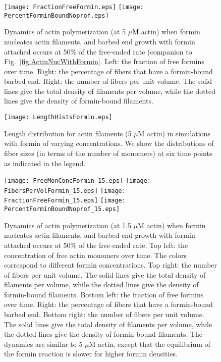 \documentclass[11pt]{article}
\begin{document}
\begin{appendices}
\begin{figure}
\centering
\texttt{[image: FractionFreeFormin.eps]}
\texttt{[image: PercentForminBoundNoprof.eps]}
\caption{Dynamics of actin polymerization (at 5 $\mu$M actin) when formin nucleates actin filaments, and barbed end growth with formin attached occurs at 50\% of the free-ended rate (companion to Fig.\ \ref{fig:ActinNucWithFormin}. Left: the fraction of free formins over time. Right: the percentage of fibers that have a formin-bound barbed end. Right: the number of fibers per unit volume. The solid lines give the total density of filaments per volume, while the dotted lines give the density of formin-bound filaments.}
\end{figure}


\begin{figure}
\centering
\texttt{[image: LengthHistsFormin.eps]}
\caption{\label{fig:HistsWithFormin}Length distribution for actin filaments (5 $\mu$M actin) in simulations with formin of varying concentrations. We show the distributions of fiber sizes (in terms of the number of monomers) at six time points as indicated in the legend.}
\end{figure}

\begin{figure}
\centering
\texttt{[image: FreeMonConcFormin\_15.eps]}
\texttt{[image: FibersPerVolFormin\_15.eps]}
\texttt{[image: FractionFreeFormin\_15.eps]}
\texttt{[image: PercentForminBoundNoprof\_15.eps]}
\caption{\label{fig:ActinLowNucWithFormin}Dynamics of actin polymerization (at 1.5 $\mu$M actin) when formin nucleates actin filaments, and barbed end growth with formin attached occurs at 50\% of the free-ended rate. Top left: the concentration of free actin monomers over time. The colors correspond to different formin concentrations. Top right: the number of fibers per unit volume. The solid lines give the total density of filaments per volume, while the dotted lines give the density of formin-bound filaments. Bottom left: the fraction of free formins over time. Right: the percentage of fibers that have a formin-bound barbed end. Bottom right: the number of fibers per unit volume. The solid lines give the total density of filaments per volume, while the dotted lines give the density of formin-bound filaments. The dynamics are similar to 5 $\mu$M actin, except that the equilibrium of the formin reaction is slower for higher formin densities.}
\end{figure}




\end{appendices}
\end{document}
